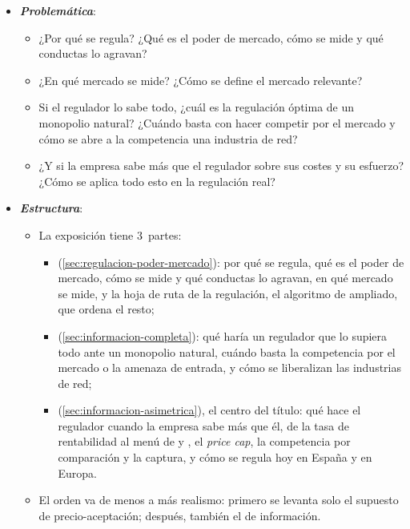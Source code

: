 \documentclass[11pt]{article}
\begin{document}
\begin{itemize}
\item \textbf{\emph{Problemática}}:
  \begin{itemize}
  \item ¿Por qué se regula? ¿Qué es el poder de mercado, cómo se mide y qué conductas lo agravan?
  \item ¿En qué mercado se mide? ¿Cómo se define el mercado relevante?
  \item Si el regulador lo sabe todo, ¿cuál es la regulación óptima de un monopolio natural? ¿Cuándo basta con hacer competir por el mercado y cómo se abre a la competencia una industria de red?
  \item ¿Y si la empresa sabe más que el regulador sobre sus costes y su esfuerzo? ¿Cómo se aplica todo esto en la regulación real?
  \end{itemize}

\item \textbf{\emph{Estructura}}:
  \begin{itemize}
  \item La exposición tiene 3~partes:
  \begin{itemize}
  \item {} (\ref{sec:regulacion-poder-mercado}): por qué se regula, qué es el poder de mercado, cómo se mide y qué conductas lo agravan, en qué mercado se mide, y la hoja de ruta de la regulación, el algoritmo de  ampliado, que ordena el resto;
  \item {} (\ref{sec:informacion-completa}): qué haría un regulador que lo supiera todo ante un monopolio natural, cuándo basta la competencia por el mercado o la amenaza de entrada, y cómo se liberalizan las industrias de red;
  \item {} (\ref{sec:informacion-asimetrica}), el centro del título: qué hace el regulador cuando la empresa sabe más que él, de la tasa de rentabilidad al menú de  y , el \emph{price cap}, la competencia por comparación y la captura, y cómo se regula hoy en España y en Europa.
  \end{itemize}
  \item El orden va de menos a más realismo: primero se levanta solo el supuesto de precio-aceptación; después, también el de información.
  \end{itemize}
\end{itemize}
\end{document}
